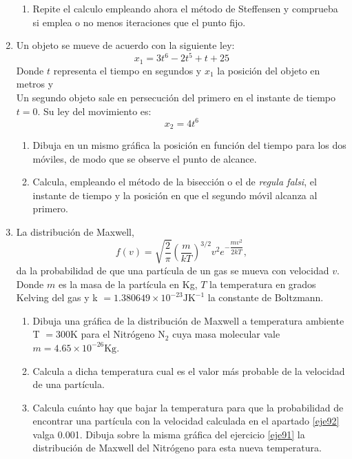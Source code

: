 \begin{paracol}{2}
\begin{enumerate}
\begin{enumerate}
\item Repite el calculo empleando ahora el método de Steffensen y comprueba si emplea o no menos iteraciones que el punto fijo.
\end{enumerate}

\item Un objeto se mueve de acuerdo con la siguiente ley:
\begin{equation}
x_1 = 3t^6 - 2t^5 + t + 25
\end{equation}
Donde  $t$ representa el tiempo en segundos y $x_1$ la posición del objeto en metros y \\
 Un segundo objeto sale en persecución del primero en el instante de tiempo $t=0$. Su ley del movimiento es:
\begin{equation}
x_2 = 4t^6
\end{equation}
\begin{enumerate}
\item Dibuja en un mismo gráfica la posición en función del tiempo para los dos móviles, de modo que se observe el punto de alcance.  
\item Calcula, empleando el método de la bisección o el de \emph{regula falsi},  el instante de tiempo y la posición en que el segundo móvil alcanza al primero.
\end{enumerate}

\item La distribución de Maxwell, 
\begin{equation}
f(v) = \sqrt{\frac{2}{\pi}}\left( \frac{m}{kT}\right)^{3/2}v^2e^{-\dfrac{\scriptstyle mv^2}{\scriptstyle 2kT}},
\end{equation}
da la probabilidad de que una partícula de un gas se mueva con velocidad $v$. Donde $m$ es la masa de la partícula en Kg, $T$ la temperatura en grados Kelving del gas y k $=1.380649\times 10^{-23} \text{JK}^{-1}$ la constante de Boltzmann. 
\begin{enumerate}
\item  \label{eje91}Dibuja una gráfica de la distribución de Maxwell a temperatura ambiente T $= 300$K para el Nitrógeno N$_2$  cuya masa molecular vale $m = 4.65 \times 10^{-26}	\text{Kg}$.
\item \label{eje92}Calcula a dicha temperatura cual es el valor más probable de la velocidad de una partícula.
\item Calcula cuánto hay que bajar la temperatura para que la probabilidad de encontrar una partícula con la velocidad calculada en el apartado \ref{eje92} valga 0.001. Dibuja sobre la misma gráfica del ejercicio \ref{eje91} la distribución de Maxwell del Nitrógeno para esta nueva temperatura. 


\end{enumerate}
\end{enumerate}
\end{paracol}
